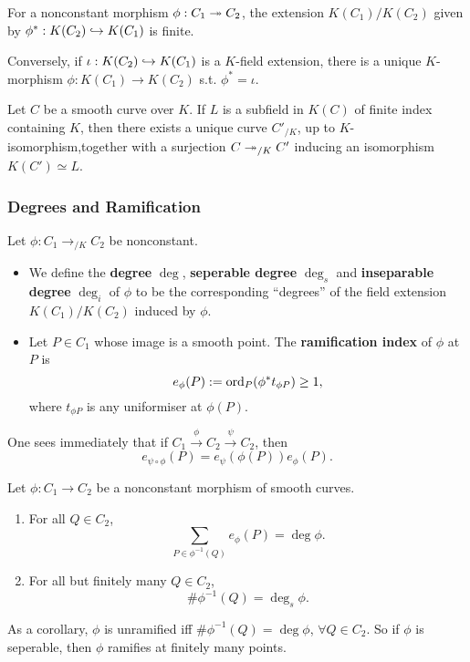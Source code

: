 \begin{theorem}
For a nonconstant morphism $\phi : C_1\twoheadrightarrow C_2$, the extension $K(C_1)/K(C_2)$ given by $\phi^* : K(C_2)\hookrightarrow K(C_1)$ is finite.

Conversely, if $\iota : K(C_2)\hookrightarrow K(C_1)$ is a $K$-field extension, there is a unique $K$-morphism $\phi : K(C_1)\to K(C_2)$ s.t. $\phi^* = \iota$.
\end{theorem}


\begin{theorem}
    Let $C$ be a smooth curve over $K$. If $L$ is a subfield in $K(C)$ of finite index containing $K$, then there exists a unique curve $C'_{/K}$, up to $K$-isomorphism,together with a surjection $C\twoheadrightarrow_{/K} C'$ inducing an isomorphism $K(C')\simeq L$.
\end{theorem}

\subsubsection*{Degrees and Ramification}
\begin{definition}
Let $\phi : C_1\to_{/K} C_2$ be nonconstant.
\begin{itemize}
    \item  We define the \textbf{degree} $\deg$, \textbf{seperable degree} $\deg_s$ and \textbf{inseparable degree} $\deg_i$ of $\phi$ to be the corresponding ``degrees'' of the field extension $K(C_1)/K(C_2)$ induced by $\phi$.
    \item Let $P\in C_1$ whose image is a smooth point. The \textbf{ramification index} of $\phi$ at $P$ is \[e_\phi(P) := \operatorname{ord}_P (\phi^*t_{\phi P})\ge 1,\]
    where $t_{\phi P}$ is any uniformiser at $\phi(P)$.
\end{itemize}
\end{definition}
One sees immediately that if $C_1\stackrel{\phi}{\to} C_2\stackrel{\psi}{\to}C_2$, then \[e_{\psi\circ\phi}(P) = e_{\psi}(\phi(P))e_{\phi}(P).\]

\begin{proposition}\label{sum rami index eq deg}
    Let $\phi : C_1\to C_2$ be a nonconstant morphism of smooth curves.\begin{enumerate}
        \item For all $Q\in C_2$,\[\sum_{P\in\phi^{-1}(Q)} e_\phi(P) = \deg\phi.\]
        \item For all but finitely many $Q\in C_2$,\[\#\phi^{-1}(Q) = \deg_s\phi.\]
    \end{enumerate}
\end{proposition}
As a corollary, $\phi$ is unramified iff $\#\phi^{-1}(Q) = \deg\phi$, $\forall Q\in C_2$. So if $\phi$ is seperable, then $\phi$ ramifies at finitely many points. 


